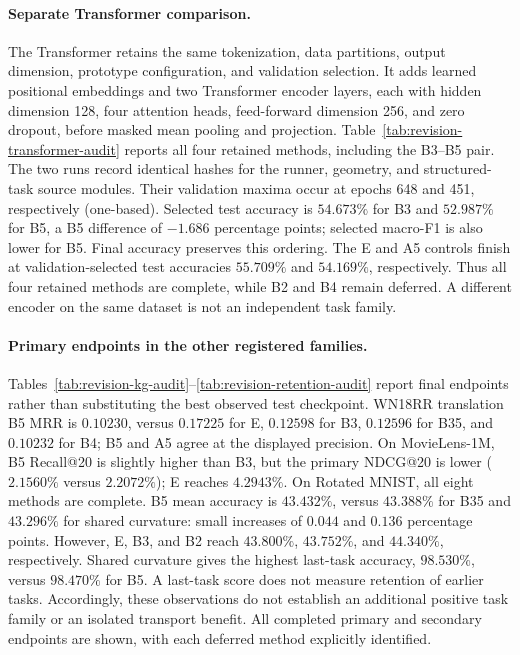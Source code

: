 \paragraph{Separate Transformer comparison.}
The Transformer retains the same tokenization, data partitions, output dimension, prototype configuration, and validation selection. It adds learned positional embeddings and two Transformer encoder layers, each with hidden dimension 128, four attention heads, feed-forward dimension 256, and zero dropout, before masked mean pooling and projection. Table~\ref{tab:revision-transformer-audit} reports all four retained methods, including the B3--B5 pair. The two runs record identical hashes for the runner, geometry, and structured-task source modules. Their validation maxima occur at epochs 648 and 451, respectively (one-based). Selected test accuracy is $54.673\%$ for B3 and $52.987\%$ for B5, a B5 difference of $-1.686$ percentage points; selected macro-F1 is also lower for B5. Final accuracy preserves this ordering. The E and A5 controls finish at validation-selected test accuracies $55.709\%$ and $54.169\%$, respectively. Thus all four retained methods are complete, while B2 and B4 remain deferred. A different encoder on the same dataset is not an independent task family.



\paragraph{Primary endpoints in the other registered families.}
Tables~\ref{tab:revision-kg-audit}--\ref{tab:revision-retention-audit} report final endpoints rather than substituting the best observed test checkpoint. WN18RR translation B5 MRR is $0.10230$, versus $0.17225$ for E, $0.12598$ for B3, $0.12596$ for B35, and $0.10232$ for B4; B5 and A5 agree at the displayed precision. On MovieLens-1M, B5 Recall@20 is slightly higher than B3, but the primary NDCG@20 is lower ($2.1560\%$ versus $2.2072\%$); E reaches $4.2943\%$. On Rotated MNIST, all eight methods are complete. B5 mean accuracy is $43.432\%$, versus $43.388\%$ for B35 and $43.296\%$ for shared curvature: small increases of $0.044$ and $0.136$ percentage points. However, E, B3, and B2 reach $43.800\%$, $43.752\%$, and $44.340\%$, respectively. Shared curvature gives the highest last-task accuracy, $98.530\%$, versus $98.470\%$ for B5. A last-task score does not measure retention of earlier tasks. Accordingly, these observations do not establish an additional positive task family or an isolated transport benefit. All completed primary and secondary endpoints are shown, with each deferred method explicitly identified.

